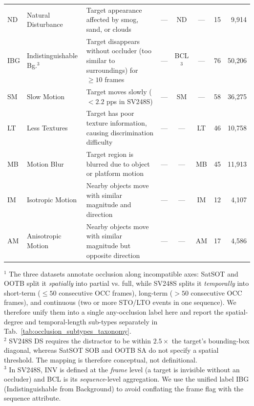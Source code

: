 \begin{table}[t]
{\begin{tabular}{llp{6.6cm}cccrr}
ND   & Natural Disturbance      & Target appearance affected by smog, sand, or clouds                                                   & --- & ND                         & ---            &  15 &  9{,}914  \\
IBG  & Indistinguishable Bg.$^{3}$ & Target disappears without occluder (too similar to surroundings) for $\geq 10$ frames              & --- & BCL$^{3}$                  & ---            &  76 & 50{,}206  \\
SM   & Slow Motion              & Target moves slowly ($< 2.2$ pps in SV248S)                                                           & --- & SM                         & ---            &  58 & 36{,}275  \\
LT   & Less Textures            & Target has poor texture information, causing discrimination difficulty                                & --- & ---                        & LT             &  46 & 10{,}758  \\
MB   & Motion Blur              & Target region is blurred due to object or platform motion                                             & --- & ---                        & MB             &  45 & 11{,}913  \\
IM   & Isotropic Motion         & Nearby objects move with similar magnitude and direction                                              & --- & ---                        & IM             &  12 &  4{,}107  \\
AM   & Anisotropic Motion       & Nearby objects move with similar magnitude but opposite direction                                     & --- & ---                        & AM             &  17 &  4{,}586  \\
\bottomrule
\end{tabular}
}
\vspace{2pt}
\begin{flushleft}\footnotesize
$^{1}$ The three datasets annotate occlusion along incompatible axes:
SatSOT and OOTB split it \emph{spatially} into partial vs. full, while
SV248S splits it \emph{temporally} into short-term ($\leq 50$
consecutive OCC frames), long-term ($>50$ consecutive OCC frames), and
continuous (two or more STO/LTO events in one sequence). We therefore
unify them into a single any-occlusion label here and report the
spatial-degree and temporal-length sub-types separately in
Tab.~\ref{tab:occlusion_subtypes_taxonomy}.
\\
$^{2}$ SV248S DS requires the distractor to be within $2.5\times$ the
target's bounding-box diagonal, whereas SatSOT SOB and OOTB SA do not
specify a spatial threshold. The mapping is therefore conceptual, not
definitional.
\\
$^{3}$ In SV248S, INV is defined at the \emph{frame} level (a target is
invisible without an occluder) and BCL is its \emph{sequence}-level
aggregation. We use the unified label IBG (Indistinguishable from
Background) to avoid conflating the frame flag with the sequence
attribute.
\end{flushleft}
\end{table}


